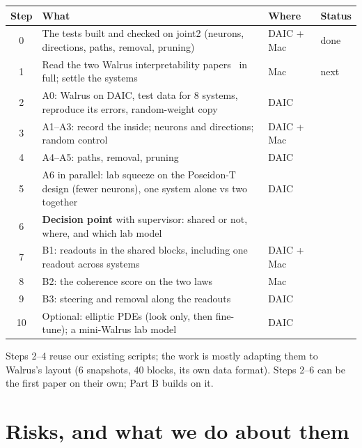 \documentclass[11pt,a4paper]{article}
\begin{document}
\begin{table}[H]
\centering
\renewcommand{\arraystretch}{1.6}
\small
\begin{tabularx}{\textwidth}{c >{\raggedright\arraybackslash}X >{\raggedright\arraybackslash}p{2.4cm} l}
\toprule
\textbf{Step} & \textbf{What} & \textbf{Where} & \textbf{Status} \\
\midrule
0 & The tests built and checked on joint2 (neurons, directions, paths, removal, pruning) & DAIC + Mac & done \\
1 & Read the two Walrus interpretability papers~\cite{fear2025, rosenfeld2026} in full; settle the systems & Mac & next \\
2 & A0: Walrus on DAIC, test data for 8 systems, reproduce its errors, random-weight copy & DAIC & \\
3 & A1--A3: record the inside; neurons and directions; random control & DAIC + Mac & \\
4 & A4--A5: paths, removal, pruning & DAIC & \\
5 & A6 in parallel: lab squeeze on the Poseidon-T design (fewer neurons), one system alone vs two together & DAIC & \\
6 & \textbf{Decision point} with supervisor: shared or not, where, and which lab model & & \\
7 & B1: readouts in the shared blocks, including one readout across systems & DAIC + Mac & \\
8 & B2: the coherence score on the two laws & Mac & \\
9 & B3: steering and removal along the readouts & DAIC & \\
10 & Optional: elliptic PDEs (look only, then fine-tune); a mini-Walrus lab model & DAIC & \\
\bottomrule
\end{tabularx}
\end{table}

Steps 2--4 reuse our existing scripts; the work is mostly adapting them to Walrus's layout (6 snapshots, 40 blocks, its own data format).
Steps 2--6 can be the first paper on their own; Part B builds on it.

\section{Risks, and what we do about them}
\end{document}
